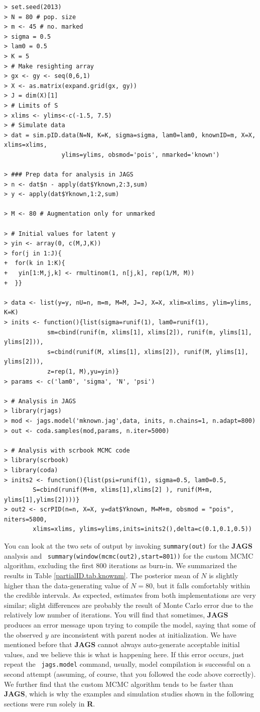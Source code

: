 {\small
\begin{verbatim}
> set.seed(2013)
> N = 80 # pop. size
> m <- 45 # no. marked
> sigma = 0.5
> lam0 = 0.5
> K = 5
> # Make resighting array
> gx <- gy <- seq(0,6,1)
> X <- as.matrix(expand.grid(gx, gy))
> J = dim(X)[1]
> # Limits of S
> xlims <- ylims<-c(-1.5, 7.5)
> # Simulate data
> dat = sim.pID.data(N=N, K=K, sigma=sigma, lam0=lam0, knownID=m, X=X, xlims=xlims,
				ylims=ylims, obsmod='pois',	nmarked='known')

> ### Prep data for analysis in JAGS
> n <- dat$n - apply(dat$Yknown,2:3,sum)
> y <- apply(dat$Yknown,1:2,sum)

> M <- 80 # Augmentation only for unmarked

> # Initial values for latent y
> yin <- array(0, c(M,J,K))
> for(j in 1:J){
+  for(k in 1:K){
+   yin[1:M,j,k] <- rmultinom(1, n[j,k], rep(1/M, M))
+  }}

> data <- list(y=y, nU=n, m=m, M=M, J=J, X=X, xlim=xlims, ylim=ylims, K=K)
> inits <- function(){list(sigma=runif(1), lam0=runif(1),
			sm=cbind(runif(m, xlims[1], xlims[2]), runif(m, ylims[1], ylims[2])),
			s=cbind(runif(M, xlims[1], xlims[2]), runif(M, ylims[1], ylims[2])),
			z=rep(1, M),yu=yin)}
> params <- c('lam0', 'sigma', 'N', 'psi')

> # Analysis in JAGS
> library(rjags)
> mod <- jags.model('mknown.jag',data, inits, n.chains=1, n.adapt=800)
> out <- coda.samples(mod,params, n.iter=5000)

> # Analysis with scrbook MCMC code
> library(scrbook)
> library(coda)
> inits2 <- function(){list(psi=runif(1), sigma=0.5, lam0=0.5,
		S=cbind(runif(M+m, xlims[1],xlims[2] ), runif(M+m, ylims[1],ylims[2])))}
> out2 <- scrPID(n=n, X=X, y=dat$Yknown, M=M+m, obsmod = "pois", niters=5800,
		xlims=xlims, ylims=ylims,inits=inits2(),delta=c(0.1,0.1,0.5))
\end{verbatim}
}
You can look at the two sets of output by invoking {\tt summary(out)}
for the {\bf JAGS} analysis and {\tt
  summary(window(mcmc(out2),start=801))} for the custom MCMC
algorithm, excluding the first 800 iterations as burn-in.  We
summarized the results in Table \ref{partialID.tab.knownm}.  The
posterior mean of $N$ is slightly higher than the data-generating
value of $N=80$, but it falls comfortably within the credible
intervals.  As expected, estimates from both implementations are very
similar; slight differences are probably the result of Monte Carlo
error due to the relatively
low number of iterations.  You will find that sometimes, {\bf JAGS}
produces an error message upon trying to compile the model, saying
that some of the observed $y$ are inconsistent with parent nodes at
initialization. We have mentioned before that {\bf JAGS} cannot always
auto-generate acceptable initial values, and we believe this is what
is happening here. If this error occurs, just repeat the {\tt
  jags.model} command, usually, model compilation is successful on a
second attempt (assuming, of course, that you followed the code above
correctly). We further find that the custom MCMC algorithm tends to be
faster than {\bf JAGS}, which is why the examples and simulation
studies shown in the following sections were run solely in {\bf R}.

